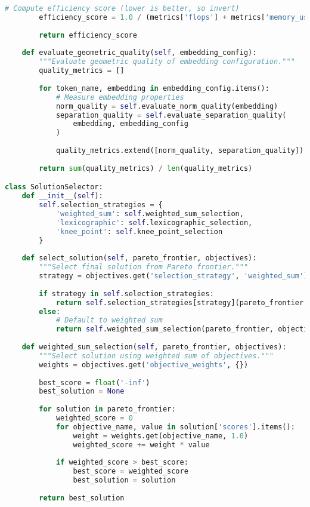 \begin{lstlisting}[language=Python, caption=Multi-objective embedding optimization]
        # Compute efficiency score (lower is better, so invert)
        efficiency_score = 1.0 / (metrics['flops'] + metrics['memory_usage'])
        
        return efficiency_score
    
    def evaluate_geometric_quality(self, embedding_config):
        """Evaluate geometric quality of embedding configuration."""
        quality_metrics = []
        
        for token_name, embedding in embedding_config.items():
            # Measure embedding properties
            norm_quality = self.evaluate_norm_quality(embedding)
            separation_quality = self.evaluate_separation_quality(
                embedding, embedding_config
            )
            
            quality_metrics.extend([norm_quality, separation_quality])
        
        return sum(quality_metrics) / len(quality_metrics)

class SolutionSelector:
    def __init__(self):
        self.selection_strategies = {
            'weighted_sum': self.weighted_sum_selection,
            'lexicographic': self.lexicographic_selection,
            'knee_point': self.knee_point_selection
        }
    
    def select_solution(self, pareto_frontier, objectives):
        """Select final solution from Pareto frontier."""
        strategy = objectives.get('selection_strategy', 'weighted_sum')
        
        if strategy in self.selection_strategies:
            return self.selection_strategies[strategy](pareto_frontier, objectives)
        else:
            # Default to weighted sum
            return self.weighted_sum_selection(pareto_frontier, objectives)
    
    def weighted_sum_selection(self, pareto_frontier, objectives):
        """Select solution using weighted sum of objectives."""
        weights = objectives.get('objective_weights', {})
        
        best_score = float('-inf')
        best_solution = None
        
        for solution in pareto_frontier:
            weighted_score = 0
            for objective_name, value in solution['scores'].items():
                weight = weights.get(objective_name, 1.0)
                weighted_score += weight * value
            
            if weighted_score > best_score:
                best_score = weighted_score
                best_solution = solution
        
        return best_solution
\end{lstlisting}


